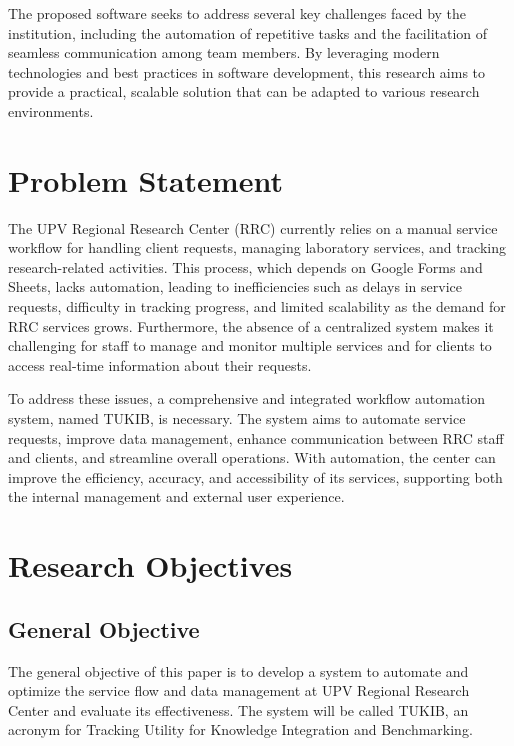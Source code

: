 The proposed software seeks to address several key challenges faced by the institution, including the automation of repetitive tasks and the facilitation of seamless communication among team members. By leveraging modern technologies and best practices in software development, this research aims to provide a practical, scalable solution that can be adapted to various research environments.

\section{Problem Statement}


The UPV Regional Research Center (RRC) currently relies on a manual service workflow for handling client requests, managing laboratory services, and tracking research-related activities. This process, which depends on Google Forms and Sheets, lacks automation, leading to inefficiencies such as delays in service requests, difficulty in tracking progress, and limited scalability as the demand for RRC services grows. Furthermore, the absence of a centralized system makes it challenging for staff to manage and monitor multiple services and for clients to access real-time information about their requests.

To address these issues, a comprehensive and integrated workflow automation system, named TUKIB, is necessary. The system aims to automate service requests, improve data management, enhance communication between RRC staff and clients, and streamline overall operations. With automation, the center can improve the efficiency, accuracy, and accessibility of its services, supporting both the internal management and external user experience.

\section{Research Objectives}
\label{sec:researchobjectives}

\subsection{General Objective}
\label{sec:generalobjective}

The general objective of this paper is to develop a system to automate and optimize the service flow and data management at UPV Regional Research Center and evaluate its effectiveness. The system will be called TUKIB, an acronym for Tracking Utility for Knowledge Integration and Benchmarking. 


